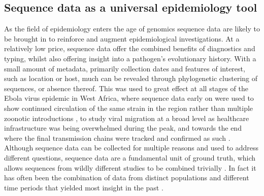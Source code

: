 \documentclass[11pt,oneside,letterpaper]{article}
\def\gdc#1{\textcolor{blue}{[#1]}}
\def\lmc#1{\textcolor{green}{[#1]}}
\begin{document}

\subsection*{Sequence data as a universal epidemiology tool}
As the field of epidemiology enters the age of genomics sequence data are likely to be brought in to reinforce and augment epidemiological investigations.
At a relatively low price, sequence data offer the combined benefits of diagnostics and typing, whilst also offering insight into a pathogen's evolutionary history.
With a small amount of metadata, primarily collection dates and features of interest, such as location or host, much can be revealed through phylogenetic clustering of sequences, or absence thereof.
This was used to great effect at all stages of the Ebola virus epidemic in West Africa, where sequence data early on were used to show continued circulation of the same strain in the region rather than multiple zoonotic introductions \citep{gire_genomic_2014}, to study viral migration at a broad level \citep{park_ebola_2015,ladner_evolution_2015} as healthcare infrastructure was being overwhelmed during the peak, and towards the end where the final transmission chains were tracked and confirmed as such \citep{arias_rapid_2016}.
Although sequence data can be collected for multiple reasons and used to address different questions, sequence data are a fundamental unit of ground truth, which allows sequences from wildly different studies to be combined trivially%
.
In fact it has often been the combination of data from distinct populations and different time periods that yielded most insight in the past \citep{dudas_virus_2017}.
\end{document}
